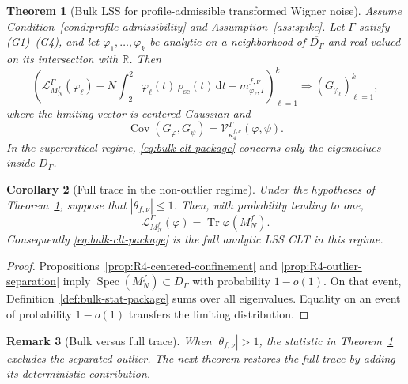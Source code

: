 \documentclass[10pt,a4paper]{amsart}
\newtheorem{theorem}{Theorem}[section]
\newtheorem{corollary}[theorem]{Corollary}
\newtheorem{remark}[theorem]{Remark}
\newcommand{\Cov}{\operatorname{Cov}}
\newcommand{\Tr}{\operatorname{Tr}}
\newcommand{\spec}{\operatorname{Spec}}
\newcommand{\scal}{\mathrm{sc}}
\newcommand{\dd}{\mathrm d}
\begin{document}
\begin{theorem}[Bulk LSS for profile-admissible transformed Wigner noise]
\label{thm:bulk-main-package}\label{thm:main}
Assume Condition~\ref{cond:profile-admissibility} and
Assumption~\ref{ass:spike}.  Let \(\Gamma\) satisfy (G1)--(G4), and
let \(\varphi_1,\ldots,\varphi_k\) be analytic on a neighborhood of
\(\overline{D_\Gamma}\) and real-valued on its intersection with
\(\mathbb R\).  Then
\begin{equation}\label{eq:bulk-clt-package}
 \left(
 \mathcal L_{M_N^f}^\Gamma(\varphi_\ell)
 -N\int_{-2}^2\varphi_\ell(t)\,\rho_{\scal}(t)\,\dd t
 -m_{\varphi_\ell,\Gamma}^{f,\nu}
 \right)_{\ell=1}^k
 \Longrightarrow
 (G_{\varphi_\ell})_{\ell=1}^k,
\end{equation}
where the limiting vector is centered Gaussian and
\begin{equation}\label{eq:bulk-cov-package}
 \Cov(G_\varphi,G_\psi)
 =\mathcal V_{\kappa_4^{f,\nu}}^\Gamma(\varphi,\psi).
\end{equation}
In the supercritical regime, \eqref{eq:bulk-clt-package} concerns only the
eigenvalues inside \(D_\Gamma\).
\end{theorem}

\begin{corollary}[Full trace in the non-outlier regime]
\label{cor:subcritical-full-package}
Under the hypotheses of Theorem~\ref{thm:bulk-main-package}, suppose that
\(|\theta_{f,\nu}|\le1\).  Then, with probability tending to one,
\begin{equation}\label{eq:full-equals-bulk-package}
 \mathcal L_{M_N^f}^\Gamma(\varphi)
 =\Tr\varphi(M_N^f).
\end{equation}
Consequently \eqref{eq:bulk-clt-package} is the full analytic LSS CLT in this
regime.
\end{corollary}

\begin{proof}
Propositions~\ref{prop:R4-centered-confinement} and
\ref{prop:R4-outlier-separation} imply
\(\spec(M_N^f)\subset D_\Gamma\) with probability \(1-o(1)\).  On that event,
Definition~\ref{def:bulk-stat-package} sums over all eigenvalues.  Equality on
an event of probability \(1-o(1)\) transfers the limiting distribution.
\end{proof}

\begin{remark}[Bulk versus full trace]
When $|\theta_{f,\nu}|>1$, the statistic in
Theorem~\ref{thm:bulk-main-package} excludes the separated outlier.  The next
theorem restores the full trace by adding its deterministic contribution.
\end{remark}
\end{document}
